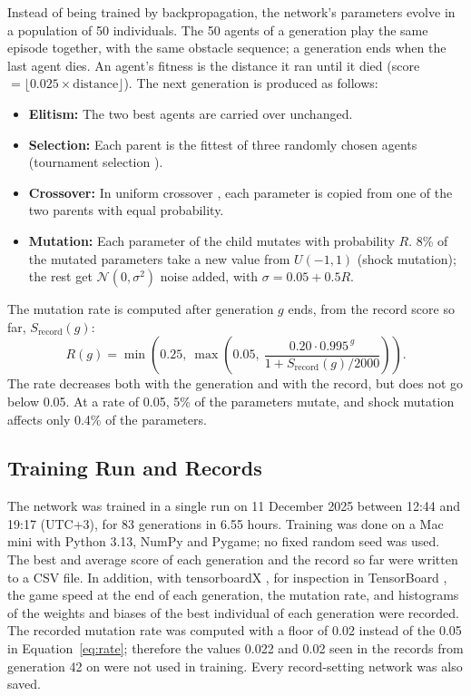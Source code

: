 \documentclass[11pt,a4paper]{article}
\begin{document}
Instead of being trained by backpropagation, the network's parameters evolve in a population of 50 individuals. The 50 agents of a generation play the same episode together, with the same obstacle sequence; a generation ends when the last agent dies. An agent's fitness is the distance it ran until it died (score $= \lfloor 0.025 \times \text{distance} \rfloor$). The next generation is produced as follows:
\begin{itemize}
  \item \textbf{Elitism:} The two best agents are carried over unchanged.
  \item \textbf{Selection:} Each parent is the fittest of three randomly chosen agents (tournament selection \cite{goldberg1991}).
  \item \textbf{Crossover:} In uniform crossover \cite{syswerda1989}, each parameter is copied from one of the two parents with equal probability.
  \item \textbf{Mutation:} Each parameter of the child mutates with probability $R$. 8\% of the mutated parameters take a new value from $U(-1, 1)$ (shock mutation); the rest get $\mathcal{N}(0, \sigma^2)$ noise added, with $\sigma = 0.05 + 0.5R$.
\end{itemize}
The mutation rate is computed after generation $g$ ends, from the record score so far, $S_{\mathrm{record}}(g)$:
\begin{equation}
  R(g) = \min\!\left(0.25,\ \max\!\left(0.05,\ \frac{0.20\cdot 0.995^{\,g}}{1 + S_{\mathrm{record}}(g)/2000}\right)\right).
  \label{eq:rate}
\end{equation}
The rate decreases both with the generation and with the record, but does not go below 0.05. At a rate of 0.05, 5\% of the parameters mutate, and shock mutation affects only 0.4\% of the parameters.

\subsection{Training Run and Records}

The network was trained in a single run on 11 December 2025 between 12:44 and 19:17 (UTC+3), for 83 generations in 6.55 hours. Training was done on a Mac mini with Python 3.13, NumPy and Pygame; no fixed random seed was used. The best and average score of each generation and the record so far were written to a CSV file. In addition, with tensorboardX \cite{tensorboardx}, for inspection in TensorBoard \cite{abadi2015}, the game speed at the end of each generation, the mutation rate, and histograms of the weights and biases of the best individual of each generation were recorded. The recorded mutation rate was computed with a floor of 0.02 instead of the 0.05 in Equation~\eqref{eq:rate}; therefore the values 0.022 and 0.02 seen in the records from generation 42 on were not used in training. Every record-setting network was also saved.
\end{document}
